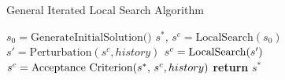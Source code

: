 \begin{algorithm}[ht]
    \caption{General Iterated Local Search Algorithm}\label{alg:base_ILS}
    \begin{algorithmic}[1]
        \State $s_0 = \text{GenerateInitialSolution()}$
        \State $s^*,\,s^c = \text{LocalSearch}(s_0)$
         
        \State $s'  = \text{Perturbation}(s^c, history)$
        \State $s\sp{c}  = \text{LocalSearch}(s\sp{\prime})$
        \State $s^c = \text{Acceptance Criterion}(s^*,\,s\sp{c}, history)$
        \EndWhile
        \State \textbf{return} $s^*$
        \EndProcedure
    \end{algorithmic}
\end{algorithm}